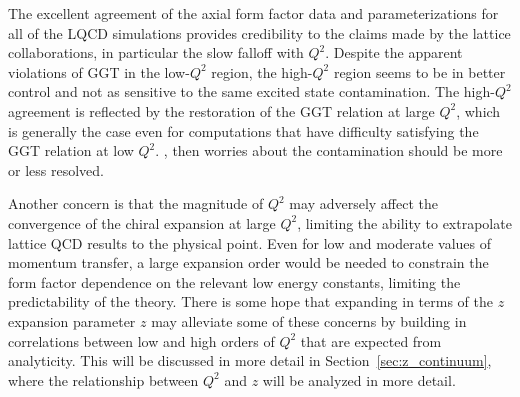 The excellent agreement of the axial form factor data and parameterizations
 for all of the LQCD simulations provides credibility to the claims
 made by the lattice collaborations, in particular the slow falloff with $Q^2$.
Despite the apparent violations of GGT in the low-$Q^2$ region,
 the high-$Q^2$ region seems to be in better control and not as sensitive to
 the same excited state contamination.
The high-$Q^2$ agreement is reflected by the restoration of the GGT relation at large $Q^2$,
 which is generally the case even for computations that have difficulty satisfying
 the GGT relation at low $Q^2$.
,
 then worries about the contamination should be more or less resolved.

Another concern is that the magnitude of $Q^2$ may adversely affect
 the convergence of the chiral expansion at large $Q^2$,
 limiting the ability to extrapolate lattice QCD results to the physical point.
Even for low and moderate values of momentum transfer,
 a large expansion order would be needed to constrain the form factor
 dependence on the relevant low energy constants,
 limiting the predictability of the theory.
There is some hope that expanding in terms of the $z$ expansion parameter $z$
 may alleviate some of these concerns by building in correlations between
 low and high orders of $Q^2$ that are expected from analyticity.
This will be discussed in more detail in Section~\ref{sec:z_continuum},
 where the relationship between $Q^2$ and $z$ will be analyzed in more detail.

